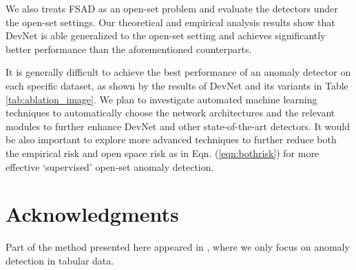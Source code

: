 \documentclass[10pt,journal,compsoc]{IEEEtran}
\begin{document}
We also treats FSAD as an open-set problem and evaluate the detectors under the open-set settings. Our theoretical and empirical analysis results show that DevNet is able generalized to the open-set setting and achieves significantly better performance than the aforementioned counterparts.

It is generally difficult to achieve the best performance of an anomaly detector on each specific dataset, as shown by the results of DevNet and its variants in Table \ref{tab:ablation_image}. We plan to investigate automated machine learning techniques to automatically choose the network architectures and the relevant modules to further enhance DevNet and other state-of-the-art detectors. It would be also important to explore more advanced techniques to further reduce both the empirical risk and open space risk as in Eqn. (\ref{eqn:bothrisk}) for more effective `supervised' open-set anomaly detection.


\section*{Acknowledgments}

Part of the method presented here appeared in
\cite{pang2019devnet}, where we only focus on anomaly detection in tabular data.




\end{document}
